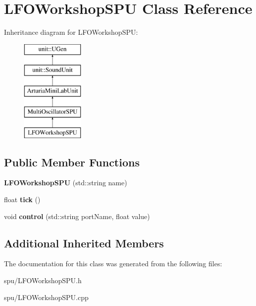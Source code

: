 \hypertarget{classLFOWorkshopSPU}{}\section{L\+F\+O\+Workshop\+S\+PU Class Reference}
\label{classLFOWorkshopSPU}
Inheritance diagram for L\+F\+O\+Workshop\+S\+PU\+:\begin{figure}[H]
\begin{center}
\leavevmode
\includegraphics[height=5.000000cm]{classLFOWorkshopSPU}
\end{center}
\end{figure}
\subsection*{Public Member Functions}
\begin{DoxyCompactItemize}
\item 
{\bfseries L\+F\+O\+Workshop\+S\+PU} (std\+::string name)\hypertarget{classLFOWorkshopSPU_af0da7426287c75e69999066976565005}{}\label{classLFOWorkshopSPU_af0da7426287c75e69999066976565005}

\item 
float {\bfseries tick} ()\hypertarget{classLFOWorkshopSPU_a0af8aaed492cecf1b6d3bf416393a8d1}{}\label{classLFOWorkshopSPU_a0af8aaed492cecf1b6d3bf416393a8d1}

\item 
void {\bfseries control} (std\+::string port\+Name, float value)\hypertarget{classLFOWorkshopSPU_a3c139a87ec2ec0c9cfa149f7652b11f8}{}\label{classLFOWorkshopSPU_a3c139a87ec2ec0c9cfa149f7652b11f8}

\end{DoxyCompactItemize}
\subsection*{Additional Inherited Members}


The documentation for this class was generated from the following files\+:\begin{DoxyCompactItemize}
\item 
spu/L\+F\+O\+Workshop\+S\+P\+U.\+h\item 
spu/L\+F\+O\+Workshop\+S\+P\+U.\+cpp\end{DoxyCompactItemize}
